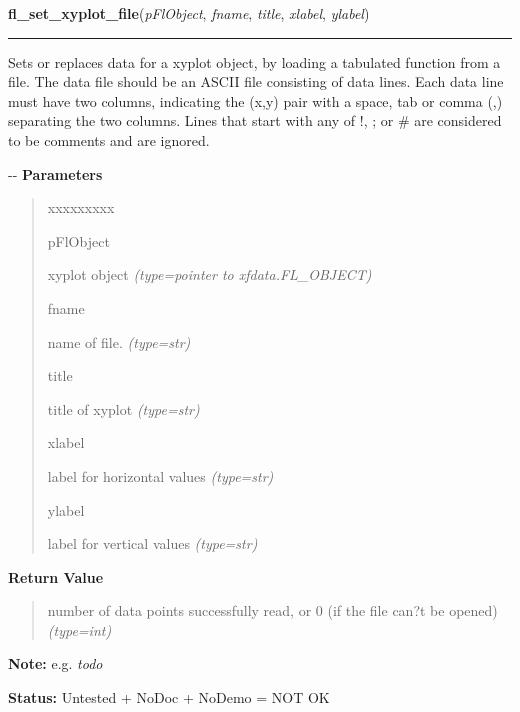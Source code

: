 \hspace{.8\funcindent}\begin{boxedminipage}{\funcwidth}

    \raggedright \textbf{fl\_set\_xyplot\_file}(\textit{pFlObject}, \textit{fname}, \textit{title}, \textit{xlabel}, \textit{ylabel})

    \vspace{-1.5ex}

    \rule{\textwidth}{0.5\fboxrule}
\setlength{\parskip}{2ex}

Sets or replaces data for a xyplot object, by loading a tabulated
function from a file. The data file should be an ASCII file consisting
of data lines. Each data line must have two columns, indicating the (x,y)
pair with a space, tab or comma (,) separating the two columns. Lines
that start with any of !, ; or \# are considered to be comments and are
ignored.

-{}-
\setlength{\parskip}{1ex}
      \textbf{Parameters}
      \vspace{-1ex}

      \begin{quote}
        \begin{Ventry}{xxxxxxxxx}

          \item[pFlObject]


xyplot object
            {\it (type=pointer to xfdata.FL\_OBJECT)}

          \item[fname]


name of file.
            {\it (type=str)}

          \item[title]


title of xyplot
            {\it (type=str)}

          \item[xlabel]


label for horizontal values
            {\it (type=str)}

          \item[ylabel]


label for vertical values
            {\it (type=str)}

        \end{Ventry}

      \end{quote}

      \textbf{Return Value}
    \vspace{-1ex}

      \begin{quote}

number of data points successfully read, or 0 (if the file can?t
be opened)
      {\it (type=int)}

      \end{quote}

\textbf{Note:} 
e.g. \emph{todo}


\textbf{Status:} 
Untested + NoDoc + NoDemo = NOT OK


    \end{boxedminipage}

